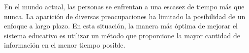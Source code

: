 
En el mundo actual, las personas se enfrentan a una escasez de tiempo más que
nunca. La aparición de diversas preocupaciones ha limitado la posibilidad de un
enfoque a largo plazo. En esta situación, la manera más óptima de mejorar el sistema
educativo es utilizar un método que proporcione la mayor cantidad de información
en el menor tiempo posible.
\cite{article:microlearning_today_students_nikkhoo}